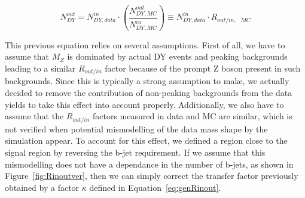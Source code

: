 \documentclass[a4paper, 10pt, openright]{report}
\begin{document}
\begin{equation}
\label{eq:Routin}
N^{out}_{DY} = N^{in}_{DY, data} \cdot \left (\frac{N^{out}_{DY, MC}}{N^{in}_{DY, MC}} \right ) \equiv  N^{in}_{DY, data} \cdot R_{out/in,\text{ } MC}
\end{equation}

This previous equation relies on several assumptions. First of all, we have to assume that $M_Z$ is dominated by actual \ac{DY} events and peaking backgrounds leading to a similar $R_{out/in}$ factor because of the prompt Z boson present in such backgrounds. Since this is typically a strong assumption to make, we actually decided to remove the contribution of non-peaking backgrounds from the data yields to take this effect into account properly. Additionally, we also have to assume that the $R_{out/in}$ factors measured in data and \ac{MC} are similar, which is not verified when potential mismodelling of the data mass shape by the simulation appear. To account for this effect, we defined a region close to the signal region by reversing the b-jet requirement. If we assume that this mismodelling does not have a dependance in the number of b-jets, as shown in Figure~\ref{fig:Rinoutver}, then we can simply correct the transfer factor previously obtained by a factor $\kappa$ defined in Equation~\ref{eq:genRinout}.%
\end{document}
